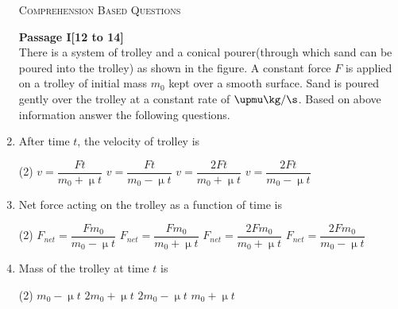 \documentclass{article}
\renewcommand{\ans}{\quad}
\begin{document}
\begin{enumerate}
    \begin{center}
        \textsc{Comprehension Based Questions}
    \end{center}
    {\textbf{Passage I[12 to 14]}}\\
    There is a system of trolley and a conical pourer(through which sand can be poured into the trolley) as shown in the figure. A constant force $F$ is applied on a trolley of initial mass $m_0$ kept over a smooth surface. Sand is poured gently over the trolley at a constant rate of $\upmu \kg/\s$. Based on above information answer the following questions.
    \begin{center}
    \end{center}
    \item After time $t$, the velocity of trolley is
    \begin{tasks}(2)
        \task $v=\dfrac{Ft}{m_0+\upmu t}$\ans
        \task $v=\dfrac{Ft}{m_0-\upmu t}$
        \task $v=\dfrac{2Ft}{m_0+\upmu t}$
        \task $v=\dfrac{2Ft}{m_0-\upmu t}$
    \end{tasks}

    \item Net force acting on the trolley as a function of time is
    \begin{tasks}(2)
        \task $F_{\textit{net}}=\dfrac{Fm_0}{m_0-\upmu t}$
        \task $F_{\textit{net}}=\dfrac{Fm_0}{m_0+\upmu t}$\ans
        \task $F_{\textit{net}}=\dfrac{2Fm_0}{m_0+\upmu t}$
        \task $F_{\textit{net}}=\dfrac{2Fm_0}{m_0-\upmu t}$
    \end{tasks}

    \item Mass of the trolley at time $t$ is
    \begin{tasks}(2)
        \task $m_0-\upmu t$
        \task $2m_0+\upmu t$
        \task $2m_0-\upmu t$
        \task $m_0+\upmu t$\ans
    \end{tasks}


\end{enumerate}
\end{document}

